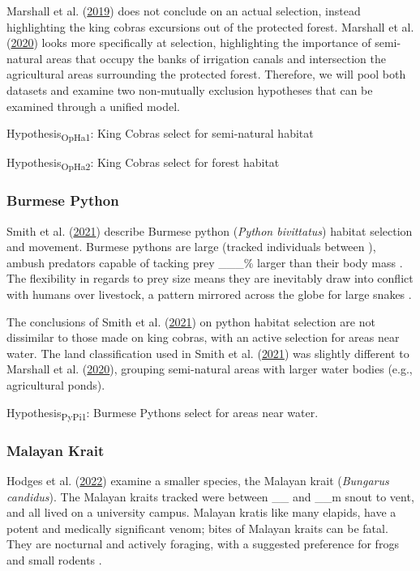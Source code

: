 \documentclass[10pt,a4paper]{article}
\begin{document}
Marshall et al. (\protect\hyperlink{ref-Marshall2018}{2019}) does not conclude on an actual selection, instead highlighting the king cobras excursions out of the protected forest.
Marshall et al. (\protect\hyperlink{ref-marshall_no_2020}{2020}) looks more specifically at selection, highlighting the importance of semi-natural areas that occupy the banks of irrigation canals and intersection the agricultural areas surrounding the protected forest.
Therefore, we will pool both datasets and examine two non-mutually exclusion hypotheses that can be examined through a unified model.

Hypothesis\textsubscript{OpHa1}: King Cobras select for semi-natural habitat

Hypothesis\textsubscript{OpHa2}: King Cobras select for forest habitat

\hypertarget{burmese-python}{%
\subsubsection{Burmese Python}\label{burmese-python}}

Smith et al. (\protect\hyperlink{ref-smith_native_2021}{2021}) describe Burmese python (\emph{Python bivittatus}) habitat selection and movement.
Burmese pythons are large (tracked individuals between ), ambush predators capable of tacking prey \_\_\_\% larger than their body mass .
The flexibility in regards to prey size means they are inevitably draw into conflict with humans over livestock, a pattern mirrored across the globe for large snakes .

The conclusions of Smith et al. (\protect\hyperlink{ref-smith_native_2021}{2021}) on python habitat selection are not dissimilar to those made on king cobras, with an active selection for areas near water.
The land classification used in Smith et al. (\protect\hyperlink{ref-smith_native_2021}{2021}) was slightly different to Marshall et al. (\protect\hyperlink{ref-marshall_no_2020}{2020}), grouping semi-natural areas with larger water bodies (e.g., agricultural ponds).

Hypothesis\textsubscript{PyPi1}: Burmese Pythons select for areas near water.

\hypertarget{malayan-krait}{%
\subsubsection{Malayan Krait}\label{malayan-krait}}

Hodges et al. (\protect\hyperlink{ref-hodges_malayan_2022}{2022}) examine a smaller species, the Malayan krait (\emph{Bungarus candidus}).
The Malayan kraits tracked were between \_\_ and \_\_m snout to vent, and all lived on a university campus.
Malayan kratis like many elapids, have a potent and medically significant venom; bites of Malayan kraits can be fatal.
They are nocturnal and actively foraging, with a suggested preference for frogs and small rodents .
\end{document}

